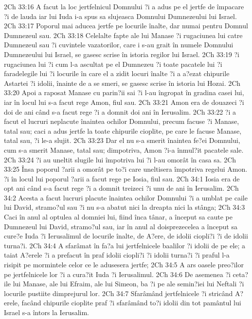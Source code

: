 2Ch 33:16  A facut la loc jertfelnicul Domnului ?i a adus pe el jertfe de împacare ?i de lauda iar lui Iuda i-a spus sa slujeasca Domnului Dumnezeului lui Israel.
2Ch 33:17  Poporul mai aducea jertfe pe locurile înalte, dar numai pentru Domnul Dumnezeul sau.
2Ch 33:18  Celelalte fapte ale lui Manase ?i rugaciunea lui catre Dumnezeul sau ?i cuvintele vazatorilor, care i s-au grait în numele Domnului Dumnezeului lui Israel, se gasesc scrise în istoria regilor lui Israel.
2Ch 33:19  ?i rugaciunea lui ?i cum l-a ascultat pe el Dumnezeu ?i toate pacatele lui ?i faradelegile lui ?i locurile în care el a zidit locuri înalte ?i a a?ezat chipurile Astartei ?i idolii, înainte de a se smeri, se gasesc scrise în istoria lui Hozai.
2Ch 33:20  Apoi a raposat Manase cu parin?ii sai ?i l-au îngropat în gradina casei lui, iar în locul lui s-a facut rege Amon, fiul sau.
2Ch 33:21  Amon era de douazeci ?i doi de ani când s-a facut rege ?i a domnit doi ani în Ierusalim.
2Ch 33:22  ?i a facut el lucruri neplacute înaintea ochilor Domnului, precum facuse ?i Manase, tatal sau; caci a adus jertfe la toate chipurile cioplite, pe care le facuse Manase, tatal sau, ?i le-a slujit.
2Ch 33:23  Dar el nu s-a smerit înaintea fe?ei Domnului, cum s-a smerit Manase, tatal sau; dimpotriva, Amon ?i-a înmul?it pacatele sale.
2Ch 33:24  ?i au uneltit slugile lui împotriva lui ?i l-au omorât în casa sa.
2Ch 33:25  Însa poporul ?arii a omorât pe to?i care uneltisera împotriva regelui Amon. ?i în locul lui poporul ?arii a facut rege pe Iosia, fiul sau.
2Ch 34:1  Iosia era de opt ani când s-a facut rege ?i a domnit treizeci ?i unu de ani în Ierusalim.
2Ch 34:2  Acesta a facut lucruri placute înaintea ochilor Domnului ?i a umblat pe caile lui David, stramo?ul sau ?i nu s-a abatut nici la dreapta nici la stânga;
2Ch 34:3  Caci în anul al optulea al domniei lui, fiind înca tânar, a început sa caute pe Dumnezeul lui David, stramo?ul sau, iar în anul al doisprezecelea a început sa cure?e Iuda ?i Ierusalimul de locurile înalte, de A?ere, de idolii ciopli?i ?i de idolii turna?i.
2Ch 34:4  A sfarâmat în fa?a lui jertfelnicele baalilor ?i idolii de pe ele; a taiat A?erele ?i a prefacut în praf idolii ciopli?i ?i idolii turna?i ?i praful l-a risipit pe mormintele celor ce le adusesera jertfe;
2Ch 34:5  A ars oasele preo?ilor pe jertfelnicele lor ?i a cura?it Iuda ?i Ierusalimul.
2Ch 34:6  De asemenea ?i ceta?ile lui Manase, ale lui Efraim, ale lui Simeon, ba ?i pe ale semin?iei lui Neftali ?i locurile pustiite dimprejurul lor.
2Ch 34:7  Sfarâmând jertfelnicele ?i stricând A?erele, facând chipurile cioplite praf ?i sfarâmând to?i idolii din tot pamântul lui Israel s-a întors la Ierusalim.
